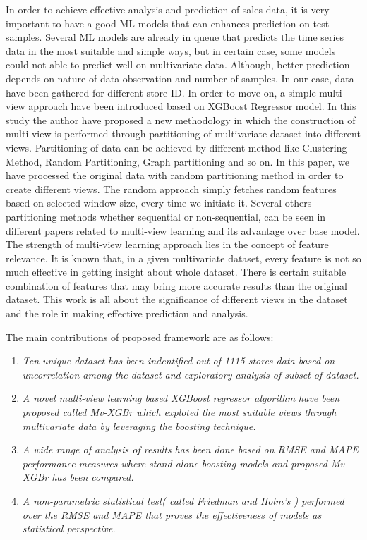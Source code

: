 In order to achieve effective analysis and prediction of sales data, it is very important to have a good ML models that can enhances prediction on test samples. 
Several ML models are already in queue that predicts the time series data in the most suitable and simple ways, but in certain case, some models could not able to predict well on multivariate data. Although, better prediction depends on nature of data observation and number of samples. In our case, data have been gathered for different store ID.  In order to move on, a simple multi-view approach have been introduced based on XGBoost Regressor model. In this study the author have proposed a new methodology in which the construction of multi-view is performed through partitioning of multivariate dataset into different views. Partitioning of data can be achieved by different method like Clustering Method, Random Partitioning, Graph partitioning and so on. In this paper, we have processed the original data with random partitioning method in order to create different views. The random approach simply fetches random features based on selected window size, every time we initiate it. Several others partitioning methods whether sequential or non-sequential, can be seen in different papers related to multi-view learning and its advantage over base model. The strength of multi-view learning approach lies in the concept of feature relevance. It is known that, in a given multivariate dataset, every feature is not so much effective in getting insight about whole dataset. There is certain suitable combination of features that may bring more accurate results than the original dataset. This work is all about the significance of different views in the dataset and the role in making effective prediction and analysis. 

The main contributions of proposed framework are as follows:

\begin{enumerate}
\item \textit{Ten unique dataset has been indentified out of 1115 stores data based on uncorrelation among the dataset and exploratory analysis of subset of dataset.}

\item \textit{A novel multi-view learning based XGBoost regressor algorithm have been proposed called Mv-XGBr which exploted the most suitable views through multivariate data by leveraging the boosting technique.}

\item \textit{A wide range of analysis of results has been done based on RMSE and MAPE performance measures where stand alone boosting models and proposed Mv-XGBr has been compared.}

\item \textit{A non-parametric  statistical test( called Friedman and Holm's ) performed over the RMSE and MAPE that proves the effectiveness of models as statistical perspective. }

\end{enumerate}


